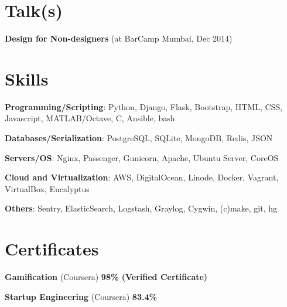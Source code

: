 \documentclass[margin,line]{resume}
\begin{document}
\begin{resume}
	\section{\mysidestyle Talk(s)}
	\begin{list2}
	\item \textbf{Design for Non-designers} (at BarCamp Mumbai, Dec 2014)
	\end{list2}

    \section{\mysidestyle Skills} 

    \begin{list2}
	\item \textbf{Programming/Scripting}: \hspace{2mm} Python, Django, Flask, Bootstrap, HTML, CSS, Javascript, MATLAB/Octave, C, Ansible, bash
	\item \textbf{Databases/Serialization}: \hspace{5.7mm} PostgreSQL, SQLite,	MongoDB, Redis, JSON
	\item \textbf{Servers/OS}: \hspace{28mm}  Nginx, Passenger, Gunicorn, Apache, Ubuntu Server, CoreOS
	\item \textbf{Cloud and Virtualization}: \hspace{3mm} AWS, DigitalOcean, Linode, Docker, Vagrant, VirtualBox, Eucalyptus
	\item \textbf{Others}: \hspace{36mm} Sentry, ElasticSearch, Logstash, Graylog, Cygwin, (c)make, git, hg
	\end{list2}

    \section{\mysidestyle Certificates}

    \begin{list2}
    \item \textbf{Gamification} (Coursera) \hspace{74mm} \textbf{98\% (Verified Certificate)}
    
	\item \textbf{Startup Engineering} (Coursera) \hspace{94mm} \textbf{83.4\%}


\end{list2}
\end{resume}
\end{document}
